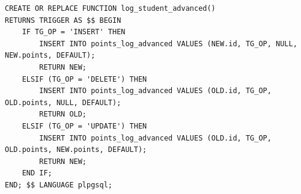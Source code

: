 \documentclass[12pt, landscape]{article}
\begin{document}
\begin{multicols*}{3}
\begin{lstlisting}
CREATE OR REPLACE FUNCTION log_student_advanced()
RETURNS TRIGGER AS $$ BEGIN
    IF TG_OP = 'INSERT' THEN
        INSERT INTO points_log_advanced VALUES (NEW.id, TG_OP, NULL, NEW.points, DEFAULT);
        RETURN NEW;
    ELSIF (TG_OP = 'DELETE') THEN
        INSERT INTO points_log_advanced VALUES (OLD.id, TG_OP, OLD.points, NULL, DEFAULT);
        RETURN OLD;
    ELSIF (TG_OP = 'UPDATE') THEN
        INSERT INTO points_log_advanced VALUES (OLD.id, TG_OP, OLD.points, NEW.points, DEFAULT);
        RETURN NEW;
    END IF;
END; $$ LANGUAGE plpgsql;
\end{lstlisting}





\end{multicols*}
\end{document}
